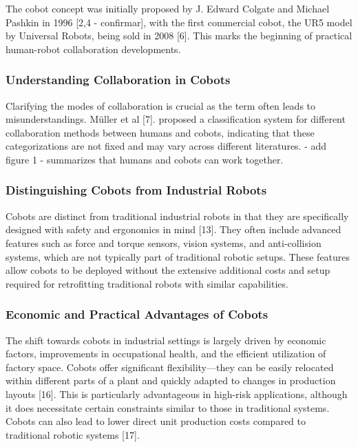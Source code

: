 The cobot concept was initially proposed by J. Edward Colgate and Michael Pashkin in 1996 [2,4 - confirmar], with the first commercial cobot, the UR5 
model by Universal Robots, being sold in 2008 [6]. This marks the beginning of practical human-robot collaboration developments.

\subsubsection{Understanding Collaboration in Cobots}

Clarifying the modes of collaboration is crucial as the term often leads to misunderstandings. Müller et al [7]. proposed a classification system for 
different collaboration methods between humans and cobots, indicating that these categorizations are not fixed and may vary across different literatures. 
- add figure 1 - summarizes that humans and cobots can work together.

\subsubsection{Distinguishing Cobots from Industrial Robots}

Cobots are distinct from traditional industrial robots in that they are specifically designed with safety and ergonomics in mind [13]. They often 
include advanced features such as force and torque sensors, vision systems, and anti-collision systems, which are not typically part of traditional 
robotic setups. These features allow cobots to be deployed without the extensive additional costs and setup required for retrofitting traditional 
robots with similar capabilities.

\subsubsection{Economic and Practical Advantages of Cobots}

The shift towards cobots in industrial settings is largely driven by economic factors, improvements in occupational health, and the efficient 
utilization of factory space. Cobots offer significant flexibility—they can be easily relocated within different parts of a plant and quickly 
adapted to changes in production layouts [16]. This is particularly advantageous in high-risk applications, although it does necessitate certain 
constraints similar to those in traditional systems. Cobots can also lead to lower direct unit production costs compared to traditional robotic 
systems [17].

